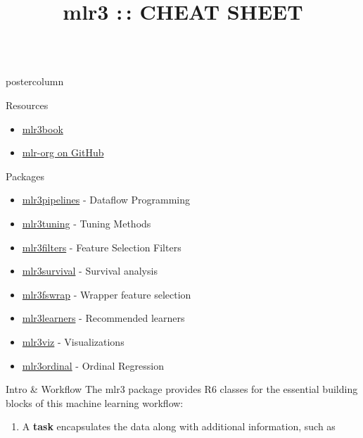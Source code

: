 \documentclass{beamer}
\title{mlr3 :\,: CHEAT SHEET} %
\newlength{\columnheight} %
\begin{document}
\begin{frame}[fragile]{}
	\begin{columns}
		\begin{column}{.245\textwidth}
			\begin{beamercolorbox}[center]{postercolumn}
				\begin{minipage}{.98\textwidth}
					\parbox[t][\columnheight]{\textwidth}{
						\begin{myblock}{Resources}
							\begin{itemize}
								\item \href{https://mlr3book.mlr-org.com/index.html}{mlr3book}
								\item \href{https://github.com/mlr-org}{mlr-org on GitHub}
							\end{itemize}
						\end{myblock}
						\begin{myblock}{Packages}
							\vfill
							\begin{itemize}
								\item \href{https://github.com/mlr-org/mlr3pipelines}{mlr3pipelines} - Dataflow Programming
								\item \href{https://github.com/mlr-org/mlr3tuning}{mlr3tuning} - Tuning Methods
								\item \href{https://github.com/mlr-org/mlr3filters}{mlr3filters} - Feature Selection Filters
								\item \href{https://github.com/mlr-org/mlr3survival}{mlr3survival} - Survival analysis
								\item \href{https://github.com/mlr-org/mlr3fswrap}{mlr3fswrap} - Wrapper feature selection
								\item \href{https://github.com/mlr-org/mlr3learners}{mlr3learners} - Recommended learners
								\item \href{https://github.com/mlr-org/mlr3viz}{mlr3viz} - Visualizations
								\item \href{https://github.com/mlr-org/mlr3ordinal}{mlr3ordinal} - Ordinal Regression
							\end{itemize}
						\end{myblock}
						\begin{myblock}{Intro \& Workflow}
							The mlr3 package provides R6 classes for the essential building
							blocks of this machine learning workflow:
							\begin{enumerate}
								\item A \textbf{task} encapsulates the data along with additional information, such as

\end{enumerate}
\end{myblock}}
\end{minipage}
\end{beamercolorbox}
\end{column}
\end{columns}
\end{frame}
\end{document}
